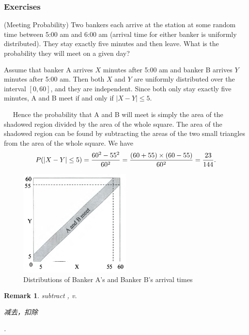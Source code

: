 \documentclass[12pt,letterpaper, onecolumn]{exam}
\newtheorem{remark}{Remark}
\begin{document}
  \subsubsection{Exercises}
    \begin{questions}
        \question[](Meeting Probability) Two bankers each arrive at the station at some random time between 5:00 am and 6:00 am (arrival time for either banker is uniformly distributed). They stay exactly five minutes and then leave. What is the probability they will meet on a given day?
        \begin{solution}
            Assume that banker A arrives $X$ minutes after 5:00 am and banker B arrives $Y$ minutes after 5:00 am. Then both $X$ and $Y$ are uniformly distributed over the interval $[0,60]$, and they are independent. Since both only stay exactly five minutes, A and B meet if and only if $|X-Y|\le 5$.

            $\quad$ Hence the probability that A and B will meet is simply the area of the shadowed region divided by the area of the whole square. The area of the shadowed region can be found by subtracting the areas of the two small triangles from the area of the whole square. We have 
            $$P(|X-Y|\le 5)=\frac{60^2-55^2}{60\time 60^2}=\frac{(60+55)\times(60-55)}{60^2}=\frac{23}{144}.$$
            \begin{figure}[H]
                \centering
                \includegraphics[width=0.5\textwidth]{figures/fig-1.png} %
                \caption{Distributions of Banker A's and Banker B's arrival times}
            \end{figure}
        \end{solution}
        \begin{remark}
            subtract , v. \begin{CJK}{UTF8}{gbsn}减去，扣除\end{CJK}.
        \end{remark}


\end{questions}
\end{document}
